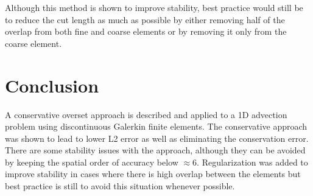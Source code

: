 \documentclass[11pt]{article}
\begin{document}
Although this method is shown to improve stability, best practice would still be to reduce
the cut length as much as possible by either removing half of the overlap from both
fine and coarse elements or by removing it only from the coarse element. 

\section{Conclusion}
A conservative overset approach is described and applied to a 1D advection problem using
discontinuous Galerkin finite elements. The conservative approach was shown to lead to lower
L2 error as well as eliminating the conservation error. There are some stability issues with 
the approach, although they can be avoided by keeping the spatial order of accuracy below $\approx 6$. 
Regularization was added to improve stability in cases where there is high overlap between
the elements but best practice is still to avoid this situation whenever possible. 
\end{document}
